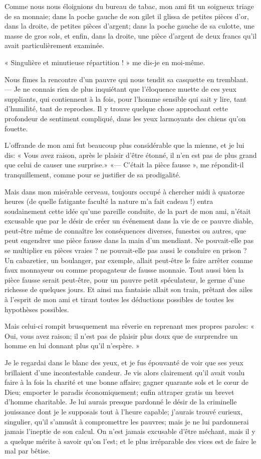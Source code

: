 Comme nous nous éloignions du bureau de tabac, mon ami fit un soigneux
triage de sa monnaie; dans la poche gauche de son gilet il glissa de
petites pièces d’or, dans la droite, de petites pièces
d’argent; dans la poche gauche de sa culotte, une
masse de gros sols, et enfin, dans la droite, une pièce
d’argent de deux francs qu’il avait
particulièrement examinée.

« Singulière et minutieuse répartition ! » me dis{}-je en moi{}-même.

Nous fîmes la rencontre d’un pauvre qui nous tendit sa
casquette en tremblant. --- Je ne connais rien de plus inquiétant que
l’éloquence muette de ces yeux suppliants, qui
contiennent à la fois, pour l’homme sensible qui sait
y lire, tant d’humilité, tant de reproches. Il y
trouve quelque chose approchant cette profondeur de sentiment
compliqué, dans les yeux larmoyants des chiens qu’on
fouette.

L’offrande de mon ami fut beaucoup plus considérable
que la mienne, et je lui dis: « Vous avez raison, après le plaisir
d’être étonné, il n’en est pas de
plus grand que celui de causer une surprise.» «---
C’était la pièce fausse », me répondit{}-il
tranquillement, comme pour se justifier de sa prodigalité.

Mais dans mon misérable cerveau, toujours occupé à chercher midi à
quatorze heures (de quelle fatigante faculté la nature
m’a fait cadeau !) entra soudainement cette idée
qu’une pareille conduite, de la part de mon ami,
n’était excusable que par le désir de créer un
événement dans la vie de ce pauvre diable, peut{}-être même de
connaître les conséquences diverses, funestes ou autres, que peut
engendrer une pièce fausse dans la main d’un mendiant.
Ne pouvait{}-elle pas se multiplier en pièces vraies ? ne
pouvait{}-elle pas aussi le conduire en prison ? Un cabaretier, un
boulanger, par exemple, allait peut{}-être le faire arrêter comme faux
monnayeur ou comme propagateur de fausse monnaie. Tout aussi bien la
pièce fausse serait peut{}-être, pour un pauvre petit spéculateur, le
germe d’une richesse de quelques jours. Et ainsi ma
fantaisie allait son train, prêtant des ailes à
l’esprit de mon ami et tirant toutes les déductions
possibles de toutes les hypothèses possibles.

Mais celui{}-ci rompit brusquement ma rêverie en reprenant mes propres
paroles: « Oui, vous avez raison; il n’est pas de
plaisir plus doux que de surprendre un homme en lui donnant plus
qu’il n’espère. »

Je le regardai dans le blanc des yeux, et je fus épouvanté de voir que
ses yeux brillaient d’une incontestable candeur. Je
vis alors clairement qu’il avait voulu faire à la fois
la charité et une bonne affaire; gagner quarante sols et le c\oe ur de
Dieu; emporter le paradis économiquement; enfin attraper gratis un
brevet d’homme charitable. Je lui aurais presque
pardonné le désir de la criminelle jouissance dont je le supposais tout
à l’heure capable; j’aurais trouvé
curieux, singulier, qu’il s’amusât à
compromettre les pauvres; mais je ne lui pardonnerai jamais
l’ineptie de son calcul. On n’est
jamais excusable d’être méchant, mais il y a quelque
mérite à savoir qu’on l’est; et le
plus irréparable des vices est de faire le mal par bêtise.

